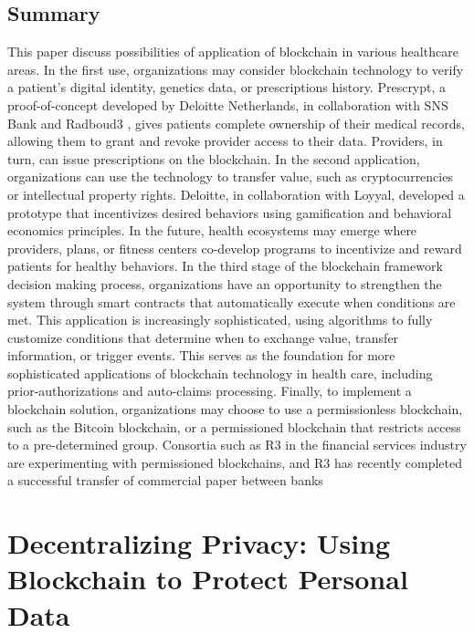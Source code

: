 \documentclass[11pt]{report}
\begin{document}
\subsection{Summary}
This paper discuss possibilities of application of blockchain in various healthcare areas.
In the first use, organizations may consider 
blockchain technology to verify a patient’s 
digital identity, genetics data, or 
prescriptions history. Prescrypt, a 
proof-of-concept developed by Deloitte 
Netherlands, in collaboration with SNS Bank 
and Radboud3
, gives patients complete 
ownership of their medical records, allowing 
them to grant and revoke provider access to 
their data. Providers, in turn, can issue 
prescriptions on the blockchain. In the 
second application, organizations can use 
the technology to transfer value, such as 
cryptocurrencies or intellectual property 
rights. Deloitte, in collaboration with Loyyal, 
developed a prototype that incentivizes 
desired behaviors using gamification and 
behavioral economics principles. In the 
future, health ecosystems may emerge 
where providers, plans, or fitness centers 
co-develop programs to incentivize and 
reward patients for healthy behaviors.  
In the third stage of the blockchain 
framework decision making process, 
organizations have an opportunity to 
strengthen
 the system through smart 
contracts that automatically execute when 
conditions are met. This application is 
increasingly sophisticated, using algorithms 
to fully customize conditions that determine 
when to exchange value, transfer 
information, or trigger events. This serves as 
the foundation for more sophisticated 
applications of blockchain technology in 
health care, including prior-authorizations 
and auto-claims processing.
Finally, to 
implement
 a blockchain solution, 
organizations may choose to use a 
permissionless blockchain, such as the 
Bitcoin blockchain, or a permissioned 
blockchain that restricts access to a 
pre-determined group. Consortia such as R3 
in the financial services industry are 
experimenting with permissioned 
blockchains, and R3 has recently completed 
a successful transfer of commercial paper 
between banks
\section{Decentralizing Privacy: Using Blockchain to Protect Personal Data\cite{4}}
\end{document}
